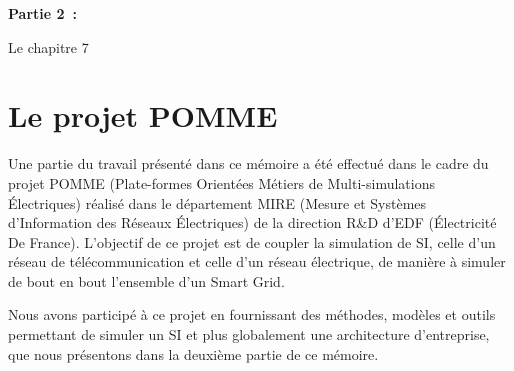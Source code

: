 \textbf{Partie 2~: }

    \begin{description}

        \item[Le chapitre 7] 

    \end{description}



\section{Le projet POMME}

Une partie du travail présenté dans ce mémoire a été effectué dans le cadre du projet
POMME (Plate-formes Orientées Métiers de Multi-simulations Électriques) 
réalisé dans le département MIRE (Mesure et Systèmes d'Information des Réseaux Électriques) 
de la direction R\&D d'EDF (Électricité De France). L'objectif de ce projet est de coupler la simulation de SI, celle d'un
réseau de télécommunication et celle d'un réseau électrique, de manière à simuler de bout en bout l'ensemble d'un Smart Grid.

Nous avons participé à ce projet en fournissant des méthodes, modèles et outils
permettant de simuler un SI et plus globalement une architecture
d'entreprise, que nous présentons dans la deuxième partie de ce mémoire. 



